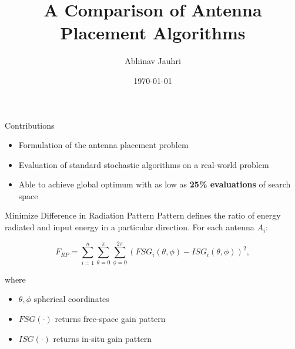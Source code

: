 \documentclass{beamer}
\title{\color{univred} A Comparison of Antenna Placement Algorithms}
\author{Abhinav Jauhri}
\date{\today}
\begin{document}
\begin{frame}
    \color{univred}
    \titlepage
\end{frame}

\begin{frame}{Contributions}
\begin{itemize} \itemsep1.5em
        \item Formulation of the antenna placement problem
        \item Evaluation of standard stochastic algorithms on a real-world problem
        \item Able to achieve global optimum with as low as \textbf{25\% evaluations} of search space
    \end{itemize}
    \vspace{5mm}
\end{frame}


\begin{frame}{Minimize Difference in Radiation Pattern}
    Pattern defines the ratio of energy radiated and input energy in a particular direction. For each antenna $A_i$:
    \begin{tcolorbox}[colback=green!5]
        \begin{equation} \label{eq:rp}
            F_{RP} = \sum_{i=1}^n\sum_{\theta=0}^\pi\sum_{\phi=0}^{2\pi}
            \left( FSG_i(\theta,\phi) - ISG_i(\theta,\phi) \right) ^2,
        \end{equation}
    \end{tcolorbox}
    where
    \begin{itemize}
            \small
        \item $\theta, \phi$ spherical coordinates
        \item $FSG(\cdot)$ returns free-space gain pattern  
        \item $ISG(\cdot)$ returns in-situ gain pattern
    \end{itemize}

    \hspace{.6\textwidth}
\end{frame}
\end{document}
